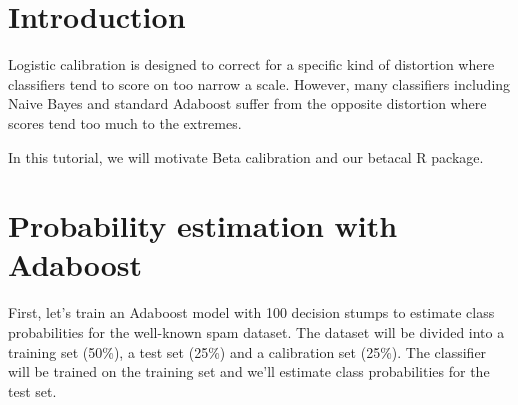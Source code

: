 \documentclass[oneside]{article}\usepackage[]{graphicx}\usepackage[]{color}
\begin{document}


\section*{Introduction}
Logistic calibration is designed to correct for a specific kind of distortion where classifiers tend to score on too narrow a scale. However, many classifiers including Naive Bayes and standard Adaboost suffer from the opposite distortion where scores tend too much to the extremes.

In this tutorial, we will motivate Beta calibration and our betacal R package.

\section*{Probability estimation with Adaboost}
First, let's train an Adaboost model with 100 decision stumps to estimate class probabilities for the well-known spam dataset. The dataset will be divided into a training set (50\%), a test set (25\%) and a calibration set (25\%). The classifier will be trained on the training set and we'll estimate class probabilities for the test set.
\end{document}

